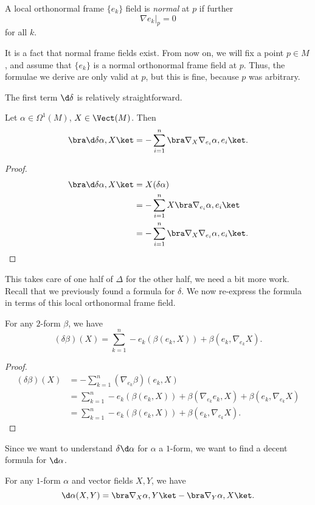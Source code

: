 \documentclass[a4paper]{article}
\begin{document}
\begin{defi}
  A local orthonormal frame $\{e_k\}$ field is \emph{normal} at $p$ if further
  \[
    \nabla e_k|_p = 0
  \]
  for all $k$.
\end{defi}
It is a fact that normal frame fields exist. From now on, we will fix a point $p \in M$, and assume that $\{e_k\}$ is a normal orthonormal frame field at $p$. Thus, the formulae we derive are only valid at $p$, but this is fine, because $p$ was arbitrary.

The first term $\d \delta$ is relatively straightforward.
\begin{lemma}
  Let $\alpha \in \Omega^1(M)$, $X \in \Vect(M)$. Then
  \[
    \bra \d \delta \alpha, X \ket = - \sum_{i = 1}^n \bra \nabla_X \nabla_{e_i} \alpha, e_i\ket.
  \]
\end{lemma}

\begin{proof}
  \begin{align*}
    \bra \d \delta \alpha, X\ket &= X( \delta \alpha) \\
    &= - \sum_{i = 1}^n X \bra \nabla_{e_i} \alpha, e_i\ket\\
    &= - \sum_{i = 1}^n \bra \nabla_X \nabla_{e_i} \alpha, e_i\ket.
  \end{align*}
\end{proof}

This takes care of one half of $\Delta$ for the other half, we need a bit more work. Recall that we previously found a formula for $\delta$. We now re-express the formula in terms of this local orthonormal frame field.

\begin{lemma}
  For any $2$-form $\beta$, we have
  \[
     (\delta \beta)(X) = \sum_{k = 1}^n -e_k( \beta(e_k, X)) + \beta(e_k, \nabla_{e_k} X).
  \]
\end{lemma}

\begin{proof}
   \begin{align*}
    (\delta \beta)(X) &= - \sum_{k = 1}^n (\nabla_{e_k} \beta)(e_k, X)\\
    &= \sum_{k = 1}^n -e_k( \beta(e_k, X)) + \beta(\nabla_{e_k} e_k, X) + \beta(e_k, \nabla_{e_k} X)\\
    &= \sum_{k = 1}^n -e_k( \beta(e_k, X)) + \beta(e_k, \nabla_{e_k} X).
  \end{align*}
\end{proof}

Since we want to understand $\delta \d \alpha$ for $\alpha$ a $1$-form, we want to find a decent formula for $\d \alpha$.
\begin{lemma}
  For any $1$-form $\alpha$ and vector fields $X, Y$, we have
  \[
    \d \alpha(X, Y) = \bra \nabla_X \alpha, Y\ket - \bra \nabla_Y \alpha, X\ket.
  \]
\end{lemma}
\end{document}
